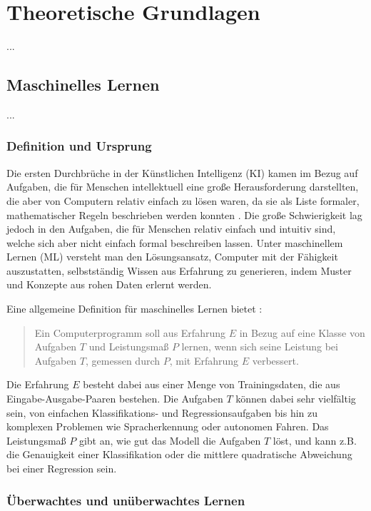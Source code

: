 \chapter{Theoretische Grundlagen}

...

\section{Maschinelles Lernen}

...

\subsection{Definition und Ursprung}

Die ersten Durchbrüche in der Künstlichen Intelligenz (KI) kamen im Bezug auf Aufgaben, die für Menschen intellektuell eine große Herausforderung darstellten, die aber von Computern relativ einfach zu lösen waren, da sie als Liste formaler, mathematischer Regeln beschrieben werden konnten \parencite{Goodfellow2016}. Die große Schwierigkeit lag jedoch in den Aufgaben, die für Menschen relativ einfach und intuitiv sind, welche sich aber nicht einfach formal beschreiben lassen. Unter maschinellem Lernen (ML) versteht man den Lösungsansatz, Computer mit der Fähigkeit auszustatten, selbstständig Wissen aus Erfahrung zu generieren, indem Muster und Konzepte aus rohen Daten erlernt werden.

Eine allgemeine Definition für maschinelles Lernen bietet \parencite{Mitchell1997}:
\begin{quote}
Ein Computerprogramm soll aus Erfahrung $E$ in Bezug auf eine Klasse von Aufgaben $T$ und Leistungsmaß $P$ lernen, wenn sich seine Leistung bei Aufgaben $T$, gemessen durch $P$, mit Erfahrung $E$ verbessert.
\end{quote}

Die Erfahrung $E$ besteht dabei aus einer Menge von Trainingsdaten, die aus Eingabe-Ausgabe-Paaren bestehen. Die Aufgaben $T$ können dabei sehr vielfältig sein, von einfachen Klassifikations- und Regressionsaufgaben bis hin zu komplexen Problemen wie Spracherkennung oder autonomen Fahren. Das Leistungsmaß $P$ gibt an, wie gut das Modell die Aufgaben $T$ löst, und kann z.B. die Genauigkeit einer Klassifikation oder die mittlere quadratische Abweichung bei einer Regression sein.

\subsection{Überwachtes und unüberwachtes Lernen}

